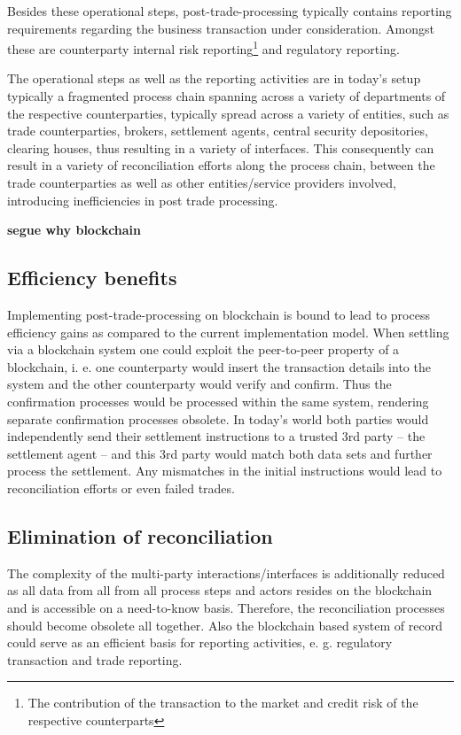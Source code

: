 Besides these operational steps, post-trade-processing typically contains reporting requirements regarding the business transaction under consideration. Amongst these are counterparty internal risk reporting\footnote{The contribution of the transaction to the market and credit risk of the respective counterparts} and regulatory reporting. 

The operational steps as well as the reporting activities are in today’s setup typically a fragmented process chain spanning across a variety of departments of the respective counterparties, typically spread across a variety of entities, such as trade counterparties, brokers, settlement agents, central security depositories, clearing houses, thus resulting in a variety of interfaces. This consequently can result in a variety of reconciliation efforts along the process chain, between the trade counterparties as well as other entities/service providers involved, introducing inefficiencies in post trade processing.

\textbf{segue why blockchain}

\subsection{Efficiency benefits}
Implementing post-trade-processing on blockchain is bound to lead to process efficiency gains as compared to the current implementation model. When settling via a blockchain system one could exploit the peer-to-peer property of a blockchain, i. e. one counterparty would insert the transaction details into the system and the other counterparty would verify and confirm.  Thus the confirmation processes would be processed within the same system, rendering separate confirmation processes obsolete. In today’s world both parties would independently send their settlement instructions to a trusted 3rd party – the settlement agent – and this 3rd party would match both data sets and further process the settlement. Any mismatches in the initial instructions would lead to reconciliation efforts or even failed trades.

\subsection{Elimination of reconciliation}
The complexity of the multi-party interactions/interfaces is additionally reduced as all data from all from all process steps and actors resides on the blockchain and is accessible on a need-to-know basis. Therefore, the reconciliation processes should become obsolete all together. Also the blockchain based system of record could serve as an efficient basis for reporting activities, e. g. regulatory transaction and trade reporting.

